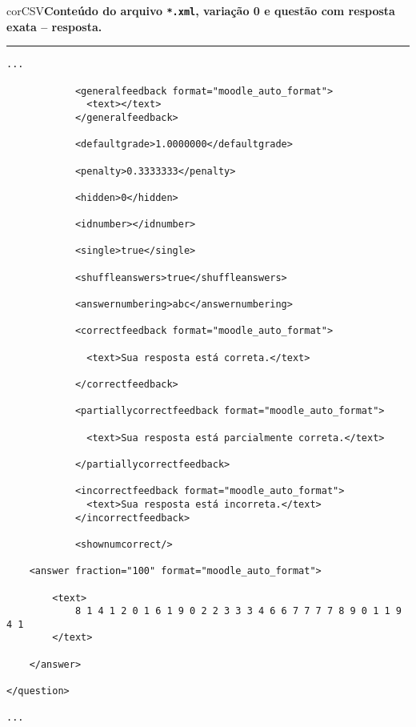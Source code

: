 \begin{myboxCode}{corCSV}{\textbf{Conteúdo do arquivo \texttt{*.xml}, variação 0 e questão com resposta exata -- resposta.}}\vspace{3mm}
\hrule
{\scriptsize
\begin{verbatim}
...

            <generalfeedback format="moodle_auto_format">
              <text></text>
            </generalfeedback>
            
            <defaultgrade>1.0000000</defaultgrade>
            
            <penalty>0.3333333</penalty>
            
            <hidden>0</hidden>
            
            <idnumber></idnumber>
            
            <single>true</single>
            
            <shuffleanswers>true</shuffleanswers>
            
            <answernumbering>abc</answernumbering>
            
            <correctfeedback format="moodle_auto_format">
            
              <text>Sua resposta está correta.</text>
              
            </correctfeedback>
            
            <partiallycorrectfeedback format="moodle_auto_format">
            
              <text>Sua resposta está parcialmente correta.</text>
              
            </partiallycorrectfeedback>
            
            <incorrectfeedback format="moodle_auto_format">
              <text>Sua resposta está incorreta.</text>
            </incorrectfeedback>
            
            <shownumcorrect/>        
            
    <answer fraction="100" format="moodle_auto_format">
    
        <text>
            8 1 4 1 2 0 1 6 1 9 0 2 2 3 3 3 4 6 6 7 7 7 7 8 9 0 1 1 9 4 1
        </text>
        
    </answer>
    
</question>

...
\end{verbatim}
}
\end{myboxCode}

